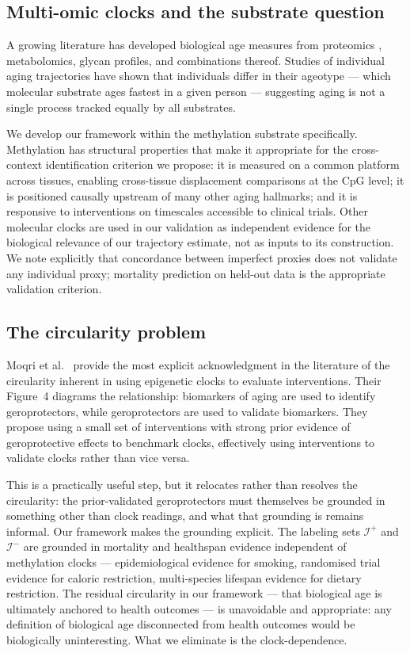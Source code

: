 \subsection{Multi-omic clocks and the substrate question}

A growing literature has developed biological age measures from proteomics
\cite{lehallier2019}, metabolomics, glycan profiles, and combinations thereof.
Studies of individual aging trajectories have shown that individuals differ in their
ageotype --- which molecular substrate ages fastest in a given person \cite{shen2020}
--- suggesting aging is not a single process tracked equally by all substrates.

We develop our framework within the methylation substrate specifically. Methylation
has structural properties that make it appropriate for the cross-context identification
criterion we propose: it is measured on a common platform across tissues, enabling
cross-tissue displacement comparisons at the CpG level; it is positioned causally
upstream of many other aging hallmarks; and it is responsive to interventions on
timescales accessible to clinical trials. Other molecular clocks are used in our
validation as independent evidence for the biological relevance of our trajectory
estimate, not as inputs to its construction. We note explicitly that concordance
between imperfect proxies does not validate any individual proxy; mortality prediction
on held-out data is the appropriate validation criterion.

\subsection{The circularity problem}

Moqri et al.\ \cite{moqri2023} provide the most explicit acknowledgment in the
literature of the circularity inherent in using epigenetic clocks to evaluate
interventions. Their Figure~4 diagrams the relationship: biomarkers of aging are used
to identify geroprotectors, while geroprotectors are used to validate biomarkers.
They propose using a small set of interventions with strong prior evidence of
geroprotective effects to benchmark clocks, effectively using interventions to
validate clocks rather than vice versa.

This is a practically useful step, but it relocates rather than resolves the
circularity: the prior-validated geroprotectors must themselves be grounded in
something other than clock readings, and what that grounding is remains informal.
Our framework makes the grounding explicit. The labeling sets $\mathcal{I}^+$ and
$\mathcal{I}^-$ are grounded in mortality and healthspan evidence independent of
methylation clocks --- epidemiological evidence for smoking, randomised trial evidence
for caloric restriction, multi-species lifespan evidence for dietary restriction.
The residual circularity in our framework --- that biological age is ultimately
anchored to health outcomes --- is unavoidable and appropriate: any definition of
biological age disconnected from health outcomes would be biologically uninteresting.
What we eliminate is the clock-dependence.
